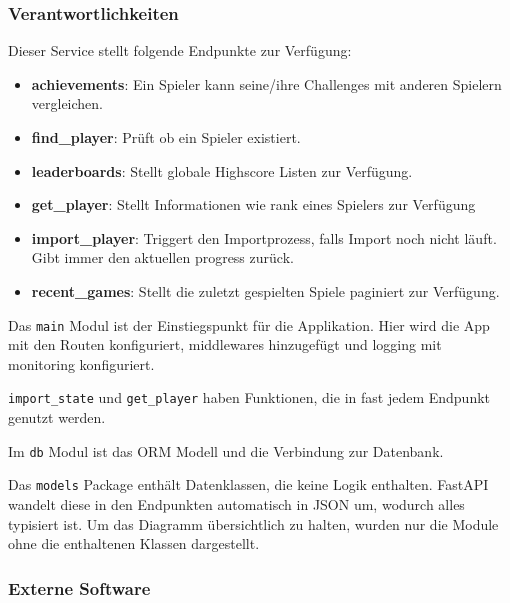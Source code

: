 \subsubsection{Verantwortlichkeiten}

Dieser Service stellt folgende Endpunkte zur Verfügung:
\begin{itemize}
    \item \textbf{achievements}: Ein Spieler kann seine/ihre Challenges mit anderen Spielern vergleichen.
    \item \textbf{find\_player}: Prüft ob ein Spieler existiert.
    \item \textbf{leaderboards}: Stellt globale Highscore Listen zur Verfügung.
    \item \textbf{get\_player}: Stellt Informationen wie rank eines Spielers zur Verfügung
    \item \textbf{import\_player}: Triggert den Importprozess, falls Import noch nicht läuft.
    Gibt immer den aktuellen progress zurück.
    \item \textbf{recent\_games}: Stellt die zuletzt gespielten Spiele paginiert zur Verfügung.
\end{itemize}

Das \lstinline{main} Modul ist der Einstiegspunkt für die Applikation.
Hier wird die App mit den Routen konfiguriert, middlewares hinzugefügt und logging mit monitoring konfiguriert.

\lstinline{import_state} und \lstinline{get_player} haben Funktionen, die in fast jedem Endpunkt genutzt werden.

Im \lstinline{db} Modul ist das ORM Modell und die Verbindung zur Datenbank.

Das \lstinline{models} Package enthält Datenklassen, die keine Logik enthalten.
FastAPI wandelt diese in den Endpunkten automatisch in JSON um, wodurch alles typisiert ist.
Um das Diagramm übersichtlich zu halten, wurden nur die Module ohne die enthaltenen Klassen dargestellt.

\subsubsection{Externe Software}

